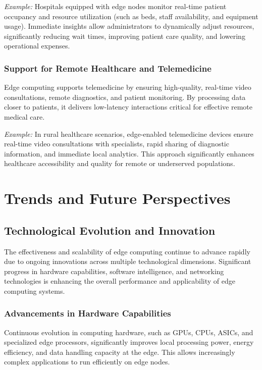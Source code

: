 \documentclass[runningheads]{llncs}
\begin{document}
\noindent\textit{Example:} Hospitals equipped with edge nodes monitor real-time patient occupancy and resource utilization (such as beds, staff availability, and equipment usage). Immediate insights allow administrators to dynamically adjust resources, significantly reducing wait times, improving patient care quality, and lowering operational expenses.

\subsubsection{Support for Remote Healthcare and Telemedicine}
Edge computing supports telemedicine by ensuring high-quality, real-time video consultations, remote diagnostics, and patient monitoring. By processing data closer to patients, it delivers low-latency interactions critical for effective remote medical care.

\noindent\textit{Example:} In rural healthcare scenarios, edge-enabled telemedicine devices ensure real-time video consultations with specialists, rapid sharing of diagnostic information, and immediate local analytics. This approach significantly enhances healthcare accessibility and quality for remote or underserved populations.


\section{Trends and Future Perspectives}

\subsection{Technological Evolution and Innovation}

The effectiveness and scalability of edge computing continue to advance rapidly due to ongoing innovations across multiple technological dimensions. Significant progress in hardware capabilities, software intelligence, and networking technologies is enhancing the overall performance and applicability of edge computing systems.

\subsubsection{Advancements in Hardware Capabilities}
Continuous evolution in computing hardware, such as GPUs, CPUs, ASICs, and specialized edge processors, significantly improves local processing power, energy efficiency, and data handling capacity at the edge. This allows increasingly complex applications to run efficiently on edge nodes.
\end{document}
